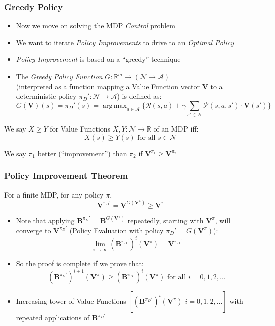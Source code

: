 \documentclass[handout]{beamer}
\DeclareMathOperator*{\argmax}{arg\,max}
\newcommand{\bvpi}{\bm{V}^{\pi}}
\newcommand{\bv}{\bm{V}}
\begin{document}
\begin{frame}
\frametitle{Greedy Policy}
\pause
\begin{itemize}[<+->]
\item Now we move on solving the MDP {\em Control} problem
\item We want to iterate {\em Policy Improvements} to drive to an {\em Optimal Policy}
\item {\em Policy Improvement} is based on a ``greedy'' technique
\item The {\em Greedy Policy Function} $G: \mathbb{R}^m \rightarrow (\mathcal{N} \rightarrow \mathcal{A})$\\
(interpreted as a function mapping a Value Function vector $\bv$ to a deterministic policy $\pi_D': \mathcal{N} \rightarrow \mathcal{A}$) is defined as:
$$G(\bv)(s) = \pi_D'(s) = \argmax_{a\in \mathcal{A}} \{\mathcal{R}(s,a) + \gamma \sum_{s' \in \mathcal{N}} \mathcal{P}(s,a,s') \cdot \bv(s') \}$$
\end{itemize}
\pause
\begin{definition}
We say $X \geq Y$ for Value Functions $X, Y: \mathcal{N} \rightarrow \mathbb{R}$ of an MDP iff:
$$X(s) \geq Y(s) \text{ for all } s \in \mathcal{N}$$
\end{definition}
\pause
We say $\pi_1$ better (``improvement'') than $\pi_2$ if $\bm{V}^{\pi_1} \geq \bm{V}^{\pi_2}$
\end{frame}

\begin{frame}
\frametitle{Policy Improvement Theorem}
\begin{theorem}
For a finite MDP, for any policy $\pi$,
$$\bm{V}^{\pi_D'} = \bm{V}^{G(\bvpi)} \geq \bvpi$$
\label{th:policy_improvement_theorem}
\end{theorem}
\pause
\begin{itemize}[<+->]
\item Note that applying $\bm{B}^{\pi_D'} = \bm{B}^{G(\bvpi)}$ repeatedly, starting with $\bvpi$, will converge to $\bm{V}^{\pi_D'}$ (Policy Evaluation with policy $\pi_D' = G(\bvpi)$):
$$\lim_{i\rightarrow \infty} (\bm{B}^{\pi_D'})^i(\bvpi) = \bm{V}^{\pi_D'}$$
\item So the proof is complete if we prove that:
$$(\bm{B}^{\pi_D'})^{i+1}(\bvpi) \geq (\bm{B}^{\pi_D'})^i(\bvpi) \text{ for all } i = 0, 1, 2, \ldots$$
\item Increasing tower of Value Functions $[(\bm{B}^{\pi_D'})^i(\bvpi)|i = 0, 1, 2, \ldots]$ with repeated applications of $\bm{B}^{\pi_D'}$
\end{itemize}
\end{frame}
\end{document}

